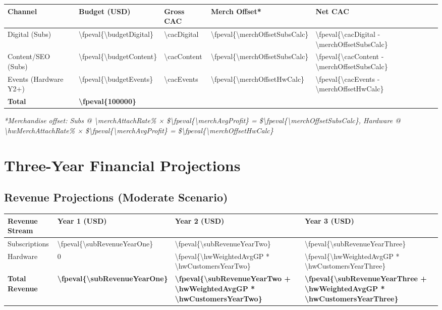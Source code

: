 \documentclass[11pt]{article}
\newcommand{\numfpeval}[1]{\num{\fpeval{#1}}}
\newcommand{\numint}[1]{\num[round-precision=0]{\fpeval{#1}}}
\begin{document}
\begin{table}[H]
\centering
\begin{tabularx}{\linewidth}{l Y Y Y Y}
\toprule
Channel & Budget (USD) & Gross CAC\cite{authoranalysis2024} & Merch Offset* & Net CAC \\\midrule
Digital (Subs) & \numint{\budgetDigital} & \num{\cacDigital} & \numfpeval{\merchOffsetSubsCalc} & \numfpeval{\cacDigital - \merchOffsetSubsCalc} \\
Content/SEO (Subs) & \numint{\budgetContent} & \num{\cacContent} & \numfpeval{\merchOffsetSubsCalc} & \numfpeval{\cacContent - \merchOffsetSubsCalc} \\
Events (Hardware Y2+) & \numint{\budgetEvents} & \num{\cacEvents} & \numfpeval{\merchOffsetHwCalc} & \numfpeval{\cacEvents - \merchOffsetHwCalc} \\\midrule
\textbf{Total} & \textbf{\numint{100000}} &  &  &  \\
\bottomrule
\end{tabularx}
\end{table}
\textit{*Merchandise offset: Subs @ \num{\merchAttachRate}\% × \$\numfpeval{\merchAvgProfit} = \$\numfpeval{\merchOffsetSubsCalc}, Hardware @ \num{\hwMerchAttachRate}\% × \$\numfpeval{\merchAvgProfit} = \$\numfpeval{\merchOffsetHwCalc}}

\section{Three-Year Financial Projections}

\subsection{Revenue Projections (Moderate Scenario)}
\begin{table}[H]
\centering
\begin{tabularx}{\linewidth}{l Y Y Y}
\toprule
Revenue Stream & Year 1 (USD) & Year 2 (USD) & Year 3 (USD) \\\midrule
Subscriptions & \numint{\subRevenueYearOne} & \numint{\subRevenueYearTwo} & \numint{\subRevenueYearThree} \\
Hardware & \num{0} & \numint{\hwWeightedAvgGP * \hwCustomersYearTwo} & \numint{\hwWeightedAvgGP * \hwCustomersYearThree} \\\midrule
\textbf{Total Revenue} & \textbf{\numint{\subRevenueYearOne}} & \textbf{\numint{\subRevenueYearTwo + \hwWeightedAvgGP * \hwCustomersYearTwo}} & \textbf{\numint{\subRevenueYearThree + \hwWeightedAvgGP * \hwCustomersYearThree}} \\
\bottomrule
\end{tabularx}
\end{table}
\end{document}
